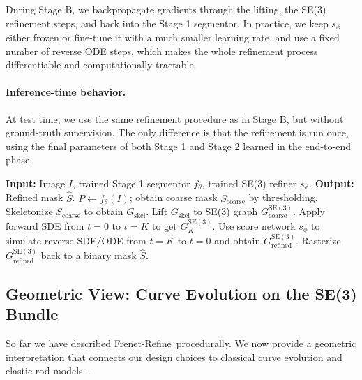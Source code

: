 \documentclass{article}
\newcommand{\SE}[1]{\mathrm{SE}(#1)}
\newcommand{\modelname}{Frenet-Refine}
\begin{document}
During Stage B, we backpropagate gradients through the lifting, the SE(3) refinement steps, and back into the Stage 1 segmentor. In practice, we keep $s_\phi$ either frozen or fine-tune it with a much smaller learning rate, and use a fixed number of reverse ODE steps, which makes the whole refinement process differentiable and computationally tractable.

\paragraph{Inference-time behavior.}
At test time, we use the same refinement procedure as in Stage B, but without ground-truth supervision. The only difference is that the refinement is run once, using the final parameters of both Stage 1 and Stage 2 learned in the end-to-end phase.

\begin{algorithm}[t]
\caption{\modelname\ Inference-Time Refinement (SE(3) Editing)}
\label{alg:refine}
\begin{algorithmic}[1]
\STATE \textbf{Input:} Image $I$, trained Stage 1 segmentor $f_\theta$, trained SE(3) refiner $s_\phi$.
\STATE \textbf{Output:} Refined mask $\hat{S}$.
\STATE $P \leftarrow f_\theta(I)$; obtain coarse mask $S_{\text{coarse}}$ by thresholding.
\STATE Skeletonize $S_{\text{coarse}}$ to obtain $G_{\text{skel}}$.
\STATE Lift $G_{\text{skel}}$ to SE(3) graph $G^{\SE{3}}_{\text{coarse}}$.
\STATE Apply forward SDE from $t=0$ to $t=K$ to get $G^{\SE{3}}_K$.
\STATE Use score network $s_\phi$ to simulate reverse SDE/ODE from $t=K$ to $t=0$ and obtain $G^{\SE{3}}_{\text{refined}}$.
\STATE Rasterize $G^{\SE{3}}_{\text{refined}}$ back to a binary mask $\hat{S}$.
\end{algorithmic}
\end{algorithm}

\subsection{Geometric View: Curve Evolution on the SE(3) Bundle}
\label{sec:geom_view}

So far we have described \modelname\ procedurally. We now provide a geometric interpretation that connects our design choices to classical curve evolution and elastic-rod models~\cite{docarmo2016differential,bergou2008discrete}.
\end{document}
